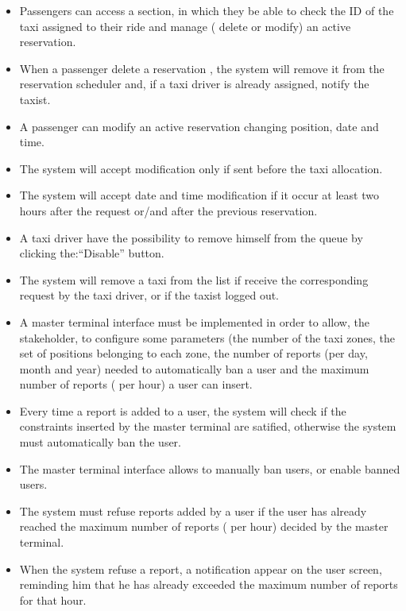 \begin{itemize}
 \item Passengers can access a section, in which they be able to check the ID of the taxi assigned to their ride 
 and manage ( delete or modify) an active reservation.
 \item When a passenger delete a reservation , the system will remove it from the reservation scheduler and, if a taxi 
 driver is already assigned, notify the taxist.
 \item A passenger can modify an active reservation changing position, date and time.
 \item The system will accept modification only if sent before the taxi allocation.
 \item The system will accept date and time modification if it occur at least two hours after the request or/and after the 
 previous reservation.
 \item A taxi driver have the possibility to remove himself from the queue by clicking the:``Disable'' button.
 \item The system will remove a taxi from the list if receive the corresponding request by the taxi driver, or if the taxist logged out.
 \item A master terminal interface must be implemented in order to allow, the stakeholder, to configure some parameters 
 (the number of the taxi zones, the set of positions belonging to each zone, the number of reports (per day, month and year)
  needed to automatically ban a user and the maximum number of reports ( per hour) a user can insert.
 \item Every time a report is added to a user, the system will check if the constraints inserted by the master terminal are satified,
 otherwise the system must automatically ban the user.
 \item The master terminal interface allows to manually ban users, or enable banned users.
 \item The system must refuse reports added by a user if the user has already reached the maximum number of reports ( per hour) decided
 by the master terminal.
 \item When the system refuse a report, a notification appear on the user screen, reminding him that he has already exceeded
 the maximum number of reports for that hour.
 \end{itemize}

